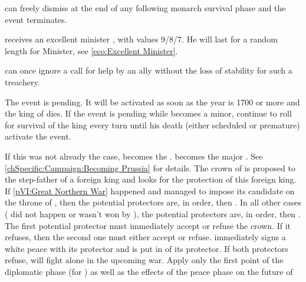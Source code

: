 

\aparag \HOL can freely dismiss \ministreHeinsius at the end of any following
monarch survival phase and the event terminates.

\phevnt
\aparag \HOL receives an excellent minister \ministreHeinsius, with values
9/8/7.  He will last for a random length for Minister, see \ref{eco:Excellent
  Minister}.

\phdipl
\aparag \HOL can once ignore a call for help by an ally without the loss of
stability for such a treachery.





\condition{}
\aparag The event is pending. It will be activated as soon as the year is 1700
or more and the king of \POL dies.
\bparag If the event is pending while \POL becomes a minor, continue to roll
for survival of the king every turn until his death (either scheduled or
premature) activate the event.

\phevnt
\aparag If this was not already the case, \POL becomes the \POLmin. \PRUMin
becomes the major \PRU. See \ref{chSpecific:Campaign:Becoming Prussia} for
details.
\aparag The crown of \payspologne is proposed to the step-father of a foreign
king and \payspologne looks for the protection of this foreign king.
\bparag If \ref{pVI:Great Northern War} happened and \SUE managed to impose
its candidate on the throne of \payspologne, then the potential protectors
are, in order, \SUE then \FRA.
\bparag In all other cases ( did not happen
or wasn't won by \SUE), the potential protectors are, in order, \FRA then
\SUE.
\bparag The first potential protector must immediately accept or refuse the
crown. If it refuses, then the second one must either accept or refuse.
\aparag \payspologne immediately signs a white peace with its protector and is
put in \EG of its protector.
\bparag If both protectors refuse, \payspologne will fight alone in the
upcoming war. Apply only the first point of the diplomatic phase (\CB for
\RUS) as well as the effects of the peace phase on the future of \payspologne

